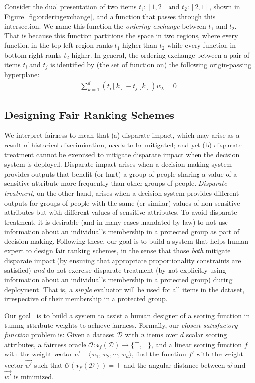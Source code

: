 Consider the dual presentation of two items $t_1:[1,2]$ and $t_2:[2,1]$, shown in Figure~\ref{fig:orderingexchange}, and a function that passes through this intersection.
We name this function the {\em ordering exchange} between $t_1$ and $t_2$.
That is because this function partitions the space in two regions, where every function in the top-left region ranks $t_1$ higher than $t_2$ while every function in bottom-right ranks $t_2$ higher.
In general, the ordering exchange between a pair of items $t_i$ and $t_j$ is identified by (the set of function on) the following origin-passing hyperplane:
\begin{align}\label{eq:mdIntersect}
\sum\limits_{k=1}^{d} (t_i[k] - t_j[k])w_k = 0
\end{align}



\subsection{Designing Fair Ranking Schemes}\label{sec:fairness2} %
We interpret fairness to mean that (a) disparate impact, which may arise as a result of historical discrimination, needs to be mitigated; and yet (b) disparate treatment cannot be exercised to mitigate disparate impact when the decision system is deployed. 
Disparate impact arises when a decision making system provides outputs that benefit (or hurt) a group of people sharing a value of a sensitive attribute more frequently than other groups of people.
{\em Disparate treatment}, on the other hand, arises when a decision system provides different outputs for groups of people with the same (or similar) values of non-sensitive attributes but with different values of sensitive attributes. To avoid disparate treatment, it is desirable (and in many cases mandated by law) to not use information about an individual's membership in a protected group as part of decision-making.
Following these, our goal is to build a system that helps human expert to design fair ranking schemes, in the sense that those {\em both} mitigate disparate impact (by ensuring that appropriate proportionality constraints are satisfied) {\em and} do not exercise disparate treatment (by not explicitly using information about an individual's membership in a protected group) during deployment.  That is, a {\em single} evaluator will be used for all items in the dataset, irrespective of their membership in a protected group.

Our goal~\cite{asudeh2019designing} is to build a system to assist a human designer of a scoring function in tuning attribute weights to achieve fairness.
Formally, our {\em closest satisfactory function} problem is:
Given a dataset $\mathcal{D}$ with $n$ items over $d$ scalar scoring attributes, a fairness oracle $\mathcal{O}: \mathcal{r}_f(\mathcal{D}) \rightarrow \{\top, \bot\}$, and a linear scoring function $f$ with the weight vector $\vec{w} = \langle w_1,w_2,\cdots ,w_d\rangle$, find the function $f'$ with the weight vector $\vec{w'}$ such that $\mathcal{O}(\mathcal{r}_{f'}(\mathcal{D}))=\top$  and the angular distance between $\vec{w}$ and $\vec{w'}$ is minimized.


